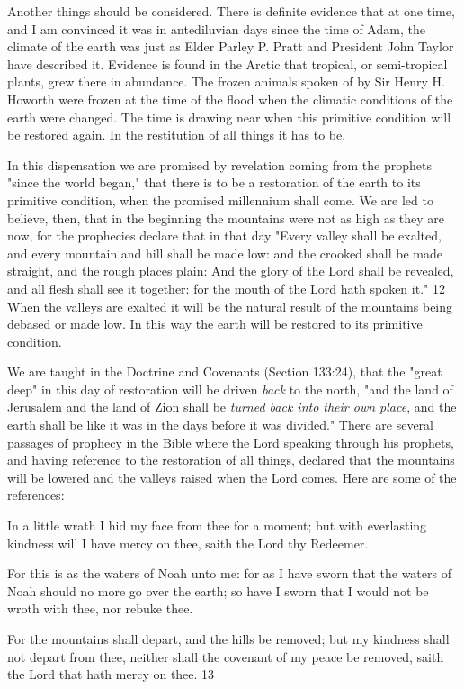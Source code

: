 Another things should be considered. There is definite evidence that at one time, and I am
convinced it was in antediluvian days since the time of Adam, the climate of the earth was
just as Elder Parley P. Pratt and President John Taylor have described it. Evidence is found in
the Arctic that tropical, or semi-tropical plants, grew there in abundance. The frozen animals
spoken of by Sir Henry H. Howorth were frozen at the time of the flood when the climatic
conditions of the earth were changed. The time is drawing near when this primitive condition
will be restored again. In the restitution of all things it has to be.

In this dispensation we are promised by revelation coming from the prophets "since the
world began," that there is to be a restoration of the earth to its primitive condition, when the
promised millennium shall come. We are led to believe, then, that in the beginning the
mountains were not as high as they are now, for the prophecies declare that in that day
"Every valley shall be exalted, and every mountain and hill shall be made low: and the
crooked shall be made straight, and the rough places plain: And the glory of the Lord shall be
revealed, and all flesh shall see it together: for the mouth of the Lord hath spoken it." 12
When the valleys are exalted it will be the natural result of the mountains being debased or
made low. In this way the earth will be restored to its primitive condition.

We are taught in the Doctrine and Covenants (Section 133:24), that the "great deep" in this
day of restoration will be driven \textit{back} to the north, "and the land of Jerusalem and the land of
Zion shall be \textit{turned back into their own place}, and the earth shall be like it was in the days
before it was divided." There are several passages of prophecy in the Bible where the Lord
speaking through his prophets, and having reference to the restoration of all things, declared
that the mountains will be lowered and the valleys raised when the Lord comes. Here are
some of the references:

In a little wrath I hid my face from thee for a moment; but with everlasting kindness will I
have mercy on thee, saith the Lord thy Redeemer.

For this is as the waters of Noah unto me: for as I have sworn that the waters of Noah should
no more go over the earth; so have I sworn that I would not be wroth with thee, nor rebuke
thee.

For the mountains shall depart, and the hills be removed; but my kindness shall not depart
from thee, neither shall the covenant of my peace be removed, saith the Lord that hath mercy
on thee. 13

